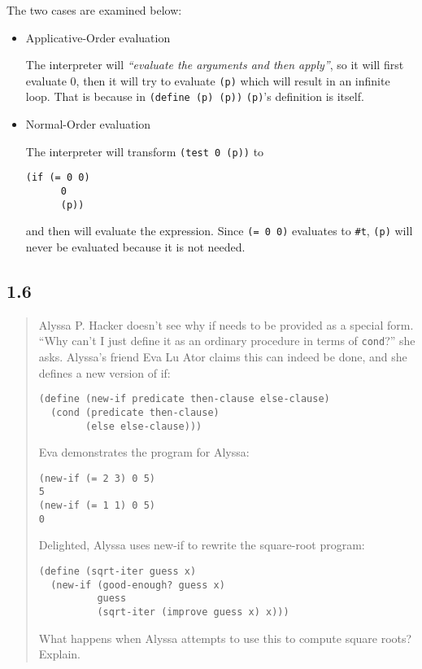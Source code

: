 \documentclass[a4paper, titlepage, twoside]{article}
\begin{document}
The two cases are examined below:

\begin{itemize}
\item Applicative-Order evaluation

The interpreter will \emph{``evaluate the arguments and then apply''}, so it will first evaluate 0, then it will try to evaluate \texttt{(p)} which will result in an infinite loop. That is because in \texttt{(define (p) (p))} \texttt{(p)}'s definition is itself.

\item Normal-Order evaluation

The interpreter will transform \texttt{(test 0 (p))} to

\begin{verbatim}
(if (= 0 0)
      0
      (p))
\end{verbatim}

and then will evaluate the expression. Since \texttt{(= 0 0)} evaluates to \texttt{#t}, \texttt{(p)} will never be evaluated because it is not needed.
\end{itemize}

\subsection*{1.6}
\label{sec:orgeef5e7a}

\begin{quote}
Alyssa P. Hacker doesn't see why if needs to be provided as a special form. “Why can't I just define it as an ordinary procedure in terms of \texttt{cond}?” she asks. Alyssa's friend Eva Lu Ator claims this can indeed be done, and she defines a new version of if:

\begin{verbatim}
(define (new-if predicate then-clause else-clause)
  (cond (predicate then-clause)
        (else else-clause)))
\end{verbatim}

Eva demonstrates the program for Alyssa:

\begin{verbatim}
(new-if (= 2 3) 0 5)
5
(new-if (= 1 1) 0 5)
0
\end{verbatim}

Delighted, Alyssa uses new-if to rewrite the square-root
program:

\begin{verbatim}
(define (sqrt-iter guess x)
  (new-if (good-enough? guess x)
          guess
          (sqrt-iter (improve guess x) x)))
\end{verbatim}

What happens when Alyssa attempts to use this to compute
square roots? Explain.
\end{quote}
\end{document}
